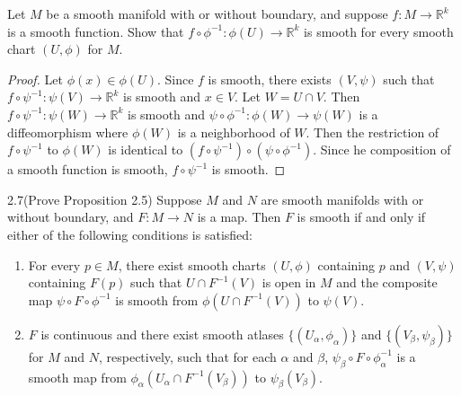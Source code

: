 \begin{customexer}{2.3}\label{ex_2_3}
  Let $M$ be a smooth manifold with or without boundary, and suppose $f: M \rightarrow \mathbb{R}^k$ is a smooth function.
  Show that $f \circ \phi^{-1}: \phi(U) \rightarrow \mathbb{R}^k$ is smooth for every smooth chart $(U, \phi)$ for $M$.
\end{customexer}

\begin{proof}
  Let $\phi(x) \in \phi(U)$.
  Since $f$ is smooth, there exists $(V, \psi)$ such that $f \circ \psi^{-1}: \psi(V) \rightarrow \mathbb{R}^k$ is smooth and $x \in V$.
  Let $W = U \cap V$.
  Then $f \circ \psi^{-1}: \psi(W) \rightarrow \mathbb{R}^k$ is smooth and $\psi \circ \phi^{-1}: \phi(W) \rightarrow \psi(W)$ is a diffeomorphism where $\phi(W)$ is a neighborhood of $W$.
  Then the restriction of $f \circ \psi^{-1}$ to $\phi(W)$ is identical to $(f \circ \psi^{-1}) \circ (\psi \circ \phi^{-1})$.
  Since he composition of a smooth function is smooth, $f \circ \psi^{-1}$ is smooth.
\end{proof}

\begin{customexer}{2.7(Prove Proposition 2.5)}
  Suppose $M$ and $N$ are smooth manifolds with or without boundary, and $F: M \rightarrow N$ is a map.
  Then $F$ is smooth if and only if either of the following conditions is satisfied:
  \begin{enumerate}[label=(\alph*)]
    \item 
      For every $p \in M$, there exist smooth charts $(U, \phi)$ containing $p$ and $(V, \psi)$ containing $F(p)$ such that $U \cap F^{-1}(V)$ is open in $M$ and the composite map $\psi \circ F \circ \phi^{-1}$ is smooth from $\phi(U \cap F^{-1}(V))$ to $\psi(V)$.
    \item
      $F$ is continuous and there exist smooth atlases $\{ (U_{\alpha}, \phi_{\alpha}) \}$ and $\{ (V_{\beta}, \psi_{\beta}) \}$ for $M$ and $N$, respectively, such that for each $\alpha$ and $\beta$, $\psi_{\beta} \circ F \circ \phi_{\alpha}^{-1}$ is a smooth map from $\phi_{\alpha}(U_{\alpha} \cap F^{-1}(V_{\beta}))$ to $\psi_{\beta}(V_{\beta})$.
  \end{enumerate}
\end{customexer}

